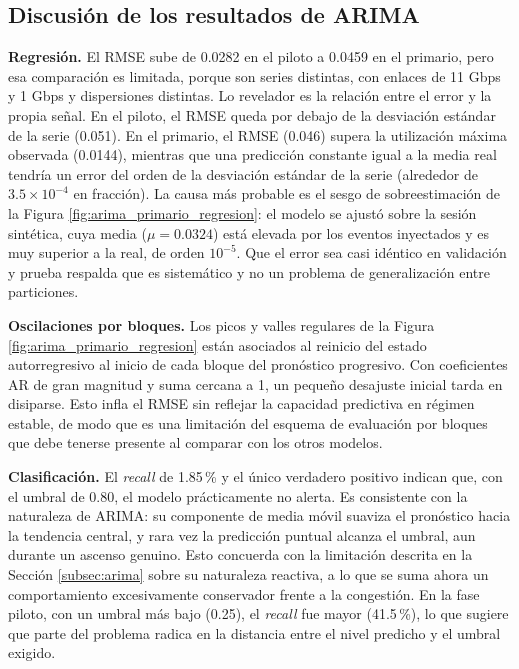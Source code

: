 \documentclass[12pt]{report}
\begin{document}
\subsection*{Discusión de los resultados de ARIMA}

\textbf{Regresión.} El RMSE sube de 0.0282 en el piloto a 0.0459 en el primario, pero esa comparación es limitada, porque son series distintas, con enlaces de 11 Gbps y 1 Gbps y dispersiones distintas. Lo revelador es la relación entre el error y la propia señal. En el piloto, el RMSE queda por debajo de la desviación estándar de la serie (0.051). En el primario, el RMSE (0.046) supera la utilización máxima observada (0.0144), mientras que una predicción constante igual a la media real tendría un error del orden de la desviación estándar de la serie (alrededor de $3.5 \times 10^{-4}$ en fracción). La causa más probable es el sesgo de sobreestimación de la Figura \ref{fig:arima_primario_regresion}: el modelo se ajustó sobre la sesión sintética, cuya media ($\mu=0.0324$) está elevada por los eventos inyectados y es muy superior a la real, de orden $10^{-5}$. Que el error sea casi idéntico en validación y prueba respalda que es sistemático y no un problema de generalización entre particiones.

\textbf{Oscilaciones por bloques.} Los picos y valles regulares de la Figura \ref{fig:arima_primario_regresion} están asociados al reinicio del estado autorregresivo al inicio de cada bloque del pronóstico progresivo. Con coeficientes AR de gran magnitud y suma cercana a 1, un pequeño desajuste inicial tarda en disiparse. Esto infla el RMSE sin reflejar la capacidad predictiva en régimen estable, de modo que es una limitación del esquema de evaluación por bloques que debe tenerse presente al comparar con los otros modelos.

\textbf{Clasificación.} El \textit{recall} de 1.85\,\% y el único verdadero positivo indican que, con el umbral de 0.80, el modelo prácticamente no alerta. Es consistente con la naturaleza de ARIMA: su componente de media móvil suaviza el pronóstico hacia la tendencia central, y rara vez la predicción puntual alcanza el umbral, aun durante un ascenso genuino. Esto concuerda con la limitación descrita en la Sección \ref{subsec:arima} sobre su naturaleza reactiva, a lo que se suma ahora un comportamiento excesivamente conservador frente a la congestión. En la fase piloto, con un umbral más bajo (0.25), el \textit{recall} fue mayor (41.5\,\%), lo que sugiere que parte del problema radica en la distancia entre el nivel predicho y el umbral exigido.
\end{document}
